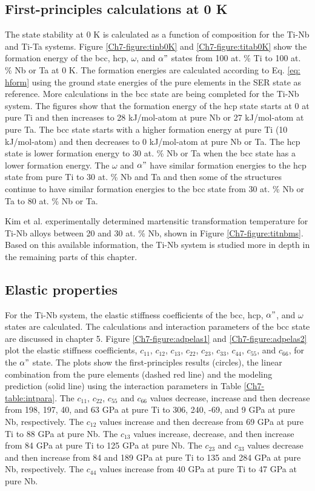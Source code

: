 \subsection{First-principles calculations at 0 K}

The state stability at 0 K is calculated as a function of composition for the Ti-Nb and Ti-Ta systems. Figure \ref{Ch7-figure:tinb0K} and \ref{Ch7-figure:titab0K} show the formation energy of the bcc, hcp, $\omega$, and $\alpha"$ states from 100 at. \% Ti to 100 at. \% Nb or Ta at 0 K. The formation energies are calculated according to Eq. \ref{eq: hform} using the ground state energies of the pure elements in the SER state as reference. More calculations in the bcc state are being completed for the Ti-Nb system. The figures show that the formation energy of the hcp state starts at 0 at pure Ti and then increases to 28 kJ/mol-atom at pure Nb or 27 kJ/mol-atom at pure Ta. The bcc state starts with a higher formation energy at pure Ti (10 kJ/mol-atom) and then decreases to 0 kJ/mol-atom at pure Nb or Ta. The hcp state is lower formation energy to 30 at. \% Nb or Ta when the bcc state has a lower formation energy. The $\omega$ and $\alpha"$ have similar formation energies to the hcp state from pure Ti to 30 at. \% Nb and Ta and then some of the structures continue to have similar formation energies to the bcc state from 30 at. \% Nb or Ta to 80 at. \% Nb or Ta.

Kim et al.  \cite{Kim2006} experimentally determined martensitic transformation temperature for Ti-Nb alloys between 20 and 30 at. \% Nb, shown in Figure \ref{Ch7-figure:titnbms}. Based on this available information, the Ti-Nb system is studied more in depth in the remaining parts of this chapter. 

\subsection{Elastic properties}

For the Ti-Nb system, the elastic stiffness coefficients of the bcc, hcp, $\alpha"$, and $\omega$ states are calculated. The calculations and interaction parameters of the bcc state are discussed in chapter 5. Figure \ref{Ch7-figure:adpelas1} and \ref{Ch7-figure:adpelas2} plot the elastic stiffness coefficients, $c_{11}$, $c_{12}$, $c_{13}$, $c_{22}$, $c_{23}$, $c_{33}$, $c_{44}$, $c_{55}$, and $c_{66}$, for the $\alpha"$ state. The plots show the first-principles results (circles), the linear combination from the pure elements (dashed red line) and the modeling prediction (solid line) using the interaction parameters in Table \ref{Ch7-table:intpara}. The $c_{11}$, $c_{22}$, $c_{55}$ and $c_{66}$ values decrease, increase and then decrease from 198, 197, 40, and 63 GPa at pure Ti to 306, 240, -69, and 9 GPa at pure Nb, respectively. The $c_{12}$ values increase and then decrease from 69 GPa at pure Ti to 88 GPa at pure Nb. The $c_{13}$ values increase, decrease, and then increase from 84 GPa at pure Ti to 125 GPa at pure Nb. The $c_{23}$ and $c_{33}$ values decrease and then increase from 84 and 189 GPa at pure Ti to 135 and 284 GPa at pure Nb, respectively. The $c_{44}$ values increase from 40 GPa at pure Ti to 47 GPa at pure Nb.

